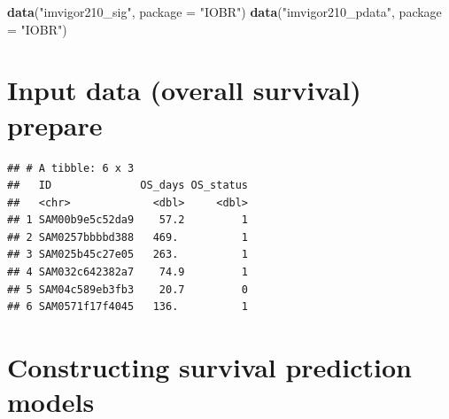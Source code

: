 \documentclass[
  12pt,
]{book}
\newenvironment{Shaded}{\begin{snugshade}}{\end{snugshade}}
\newcommand{\AttributeTok}[1]{\textcolor[rgb]{0.13,0.29,0.53}{#1}}
\newcommand{\FunctionTok}[1]{\textcolor[rgb]{0.13,0.29,0.53}{\textbf{#1}}}
\newcommand{\NormalTok}[1]{#1}
\newcommand{\OtherTok}[1]{\textcolor[rgb]{0.56,0.35,0.01}{#1}}
\newcommand{\SpecialCharTok}[1]{\textcolor[rgb]{0.81,0.36,0.00}{\textbf{#1}}}
\newcommand{\StringTok}[1]{\textcolor[rgb]{0.31,0.60,0.02}{#1}}
\begin{document}
\begin{Shaded}
\begin{Highlighting}[]
\FunctionTok{data}\NormalTok{(}\StringTok{"imvigor210\_sig"}\NormalTok{, }\AttributeTok{package =} \StringTok{"IOBR"}\NormalTok{)}
\FunctionTok{data}\NormalTok{(}\StringTok{"imvigor210\_pdata"}\NormalTok{, }\AttributeTok{package =} \StringTok{"IOBR"}\NormalTok{)}
\end{Highlighting}
\end{Shaded}

\hypertarget{input-data-overall-survival-prepare}{%
\section{Input data (overall survival) prepare}\label{input-data-overall-survival-prepare}}

\begin{Shaded}
\end{Shaded}

\begin{verbatim}
## # A tibble: 6 x 3
##   ID              OS_days OS_status
##   <chr>             <dbl>     <dbl>
## 1 SAM00b9e5c52da9    57.2         1
## 2 SAM0257bbbbd388   469.          1
## 3 SAM025b45c27e05   263.          1
## 4 SAM032c642382a7    74.9         1
## 5 SAM04c589eb3fb3    20.7         0
## 6 SAM0571f17f4045   136.          1
\end{verbatim}

\hypertarget{constructing-survival-prediction-models}{%
\section{Constructing survival prediction models}\label{constructing-survival-prediction-models}}
\end{document}
